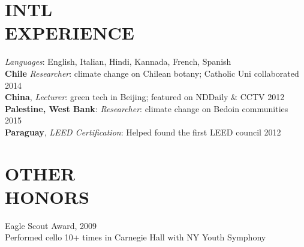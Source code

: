 \documentclass[margin]{res}
\begin{document}
\begin{resume}


\section{INTL\\EXPERIENCE}
{\sl Languages}: English, Italian, Hindi, Kannada, French, Spanish \\
{\bf Chile} {\sl Researcher}: climate change on Chilean botany; Catholic Uni collaborated \hfill 2014\\
{\bf China}, {\sl Lecturer}: green tech in Beijing; featured on NDDaily \& CCTV \hfill 2012\\
{\bf Palestine, West Bank}: {\sl Researcher}: climate change on Bedoin communities \hfill 2015\\
{\bf Paraguay}, {\sl LEED Certification}: Helped found the first LEED council \hfill 2012

\section{OTHER \\ HONORS}

Eagle Scout Award, 2009
\\Performed cello 10+ times in Carnegie Hall with NY Youth Symphony 



\end{resume}
\end{document}
